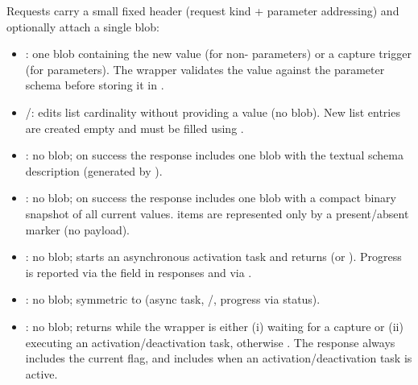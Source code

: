 Requests carry a small fixed header (request kind + parameter addressing) and optionally attach a single blob:
\begin{itemize}
    \item {}: one blob containing the new value (for non- parameters) or a capture trigger (for  parameters). The wrapper validates the value against the parameter schema before storing it in .
    \item {}/: edits list cardinality without providing a value (no blob). New list entries are created empty and must be filled using .
    \item {}: no blob; on success the response includes one blob with the textual schema description (generated by ).
    \item {}: no blob; on success the response includes one blob with a compact binary snapshot of all current values.  items are represented only by a present/absent marker (no payload).
    \item {}: no blob; starts an asynchronous activation task and returns  (or ). Progress is reported via the  field in responses and via .
    \item {}: no blob; symmetric to  (async task, /, progress via status).
    \item {}: no blob; returns  while the wrapper is either (i) waiting for a  capture or (ii) executing an activation/deactivation task, otherwise . The response always includes the current  flag, and includes  when an activation/deactivation task is active. 


\end{itemize}
